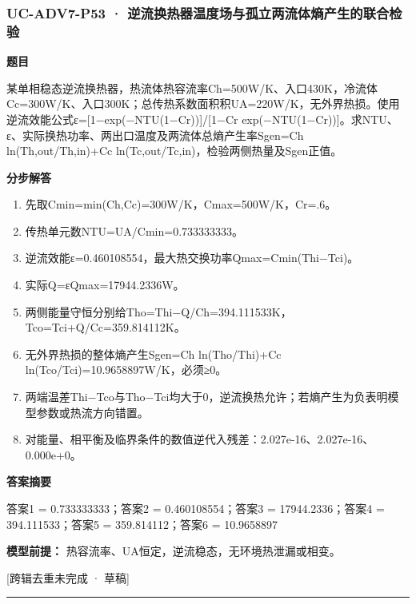 \documentclass[UTF8,11pt,a4paper]{ctexart}
\begin{document}
\subsubsection*{UC-ADV7-P53 · 逆流换热器温度场与孤立两流体熵产生的联合检验}
\noindent\textbf{题目}\par
某单相稳态逆流换热器，热流体热容流率Ch=500W/K、入口430K，冷流体Cc=300W/K、入口300K；总传热系数面积积UA=220W/K，无外界热损。使用逆流效能公式ε=[1−exp(−NTU(1−Cr))]/[1−Cr exp(−NTU(1−Cr))]。求NTU、ε、实际换热功率、两出口温度及两流体总熵产生率Sgen=Ch ln(Th,out/Th,in)+Cc ln(Tc,out/Tc,in)，检验两侧热量及Sgen正值。\par
\medskip\noindent\textbf{分步解答}
\begin{enumerate}
\item 先取Cmin=min(Ch,Cc)=300W/K，Cmax=500W/K，Cr=.6。
\item 传热单元数NTU=UA/Cmin=0.733333333。
\item 逆流效能ε=0.460108554，最大热交换功率Qmax=Cmin(Thi−Tci)。
\item 实际Q=εQmax=17944.2336W。
\item 两侧能量守恒分别给Tho=Thi−Q/Ch=394.111533K，Tco=Tci+Q/Cc=359.814112K。
\item 无外界热损的整体熵产生Sgen=Ch ln(Tho/Thi)+Cc ln(Tco/Tci)=10.9658897W/K，必须≥0。
\item 两端温差Thi−Tco与Tho−Tci均大于0，逆流换热允许；若熵产生为负表明模型参数或热流方向错置。
\item 对能量、相平衡及临界条件的数值逆代入残差：2.027e-16、2.027e-16、0.000e+0。
\end{enumerate}
\noindent\textbf{答案摘要}\par
答案1 = 0.733333333；答案2 = 0.460108554；答案3 = 17944.2336；答案4 = 394.111533；答案5 = 359.814112；答案6 = 10.9658897\par
\noindent\textbf{模型前提：}
热容流率、UA恒定，逆流稳态，无环境热泄漏或相变。\par
\noindent\textcolor{red!65!black}{[跨辑去重未完成 · 草稿]} \par
\medskip\hrule\medskip
{}
\end{document}
